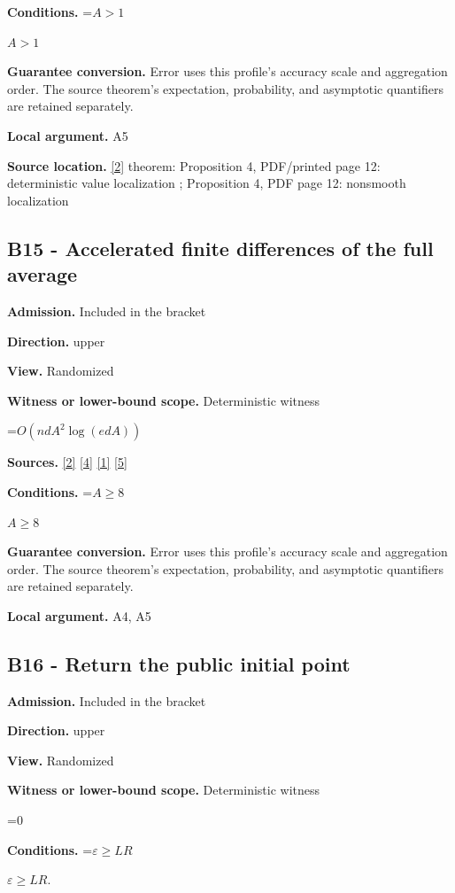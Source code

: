 \documentclass[10pt,a4paper]{article}
\newcommand{\AtlasMath}[1]{\par\begingroup\centering\setbox0=\hbox{$\displaystyle #1$}\ifdim\wd0>1.4\linewidth\typeout{ATLAS WIDE FORMULA: \the\wd0}\fi\ifdim\wd0>\linewidth\resizebox{\linewidth}{!}{\box0}\else\box0\fi\par\endgroup}
\newcommand{\AtlasInlineMath}[1]{\begingroup\setbox0=\hbox{$#1$}\ifdim\wd0>.4\linewidth\endgroup\AtlasMath{#1}\else\endgroup$#1$\fi}
\begin{document}
\textbf{Conditions.} \AtlasInlineMath{A>1}

\textbf{Guarantee conversion.} Error uses this profile's accuracy scale and aggregation order. The source theorem's expectation, probability, and asymptotic quantifiers are retained separately.

\textbf{Local argument.} A5

\textbf{Source location.} \href{https://arxiv.org/html/2607.16558v2}{[2]} theorem: Proposition 4, PDF/printed page 12: deterministic value localization ; Proposition 4, PDF page 12: nonsmooth localization

\subsection{B15 - Accelerated finite differences of the full average}
\textbf{Admission.} Included in the bracket

\textbf{Direction.} upper

\textbf{View.} Randomized

\textbf{Witness or lower-bound scope.} Deterministic witness

\AtlasMath{O(ndA^2\log(edA))}
\textbf{Sources.} \href{https://arxiv.org/html/2607.16558v2}{[2]} \href{https://www.mathnet.ru/php/archive.phtml?jrnid=mzm&option_lang=eng&paperid=1697&wshow=paper}{[4]} \href{https://arxiv.org/html/2610.00345v1}{[1]} \href{https://arxiv.org/abs/2109.08858}{[5]}

\textbf{Conditions.} \AtlasInlineMath{A\ge8}

\textbf{Guarantee conversion.} Error uses this profile's accuracy scale and aggregation order. The source theorem's expectation, probability, and asymptotic quantifiers are retained separately.

\textbf{Local argument.} A4, A5

\subsection{B16 - Return the public initial point}
\textbf{Admission.} Included in the bracket

\textbf{Direction.} upper

\textbf{View.} Randomized

\textbf{Witness or lower-bound scope.} Deterministic witness

\AtlasMath{0}
\textbf{Conditions.} \AtlasInlineMath{\varepsilon\ge LR}.
\end{document}
